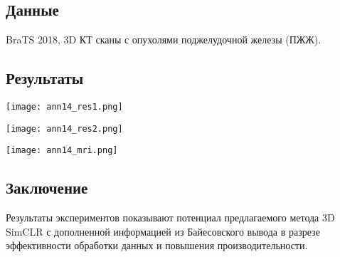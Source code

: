 \subsection*{Данные}
BraTS 2018, 3D КТ сканы с опухолями поджелудочной железы (ПЖЖ).
\subsection*{Результаты}

\begin{minipage}{0.49\linewidth}
    \begin{center}
        \texttt{[image: ann14\_res1.png]} \\
    \end{center}
    
\end{minipage}
\begin{minipage}{0.49\linewidth}
    \begin{center}
        \texttt{[image: ann14\_res2.png]} \\
    \end{center}
    
\end{minipage} 


\begin{minipage}{1.0\linewidth}
    \begin{center}
        \texttt{[image: ann14\_mri.png]} \\
    \end{center}
    
\end{minipage}
\newpage
\subsection*{Заключение}
Результаты экспериментов показывают потенциал предлагаемого метода 3D SimCLR с 
дополненной информацией из Байесовского вывода в разрезе эффективности 
обработки данных и повышения производительности. 